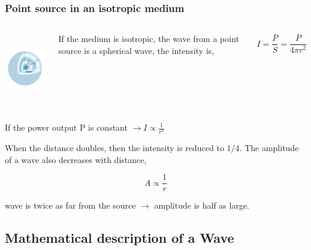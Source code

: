 \documentclass[]{beamer}
\begin{document}
\begin{frame}
\frametitle{Point source in an isotropic medium}



   \begin{columns}[c]
   \column{2in}  %
  
\pause

 \begin{center}
  \includegraphics[height=1.2in]{images4/8.jpg}
\end{center}

   \column{2.4in}

\pause


If the medium is isotropic, the wave from a point source is
a spherical wave, the intensity is,

\pause

\begin{equation}
I=\frac{\overline P}{S}=\frac{\overline P}{4\pi r^2}
\end{equation}


   \end{columns}

\pause

If the power output P is constant $\rightarrow I\propto \frac{1}{r^2}$
\vspace{2mm}

\pause

When the distance doubles, then the intensity is
reduced to $1/4$. The amplitude of a wave also decreases with distance,

\pause

\begin{equation}
A\propto \frac{1}{r}
\end{equation}

\pause

wave is twice as far from the source $\rightarrow$ amplitude is half as large.

  \end{frame}

\subsection{Mathematical description of a Wave}
\end{document}
